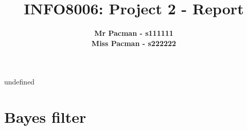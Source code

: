 undefined



\title{\Large{INFO8006: Project 2 - Report}}
\vspace{1cm}
\author{\small{\bf Mr Pacman - s111111} \\ \small{\bf Miss Pacman - s222222}}

\maketitle


\section{Bayes filter}

